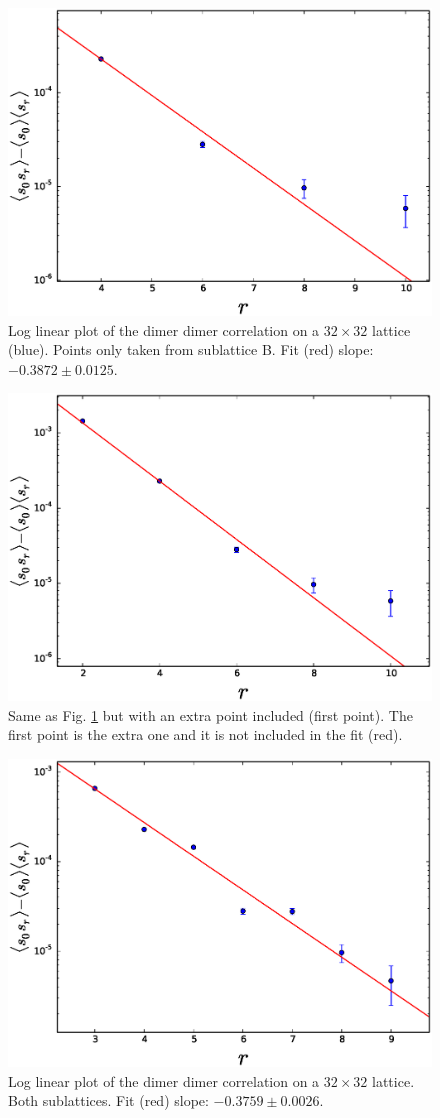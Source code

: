 \documentclass[aps,floatfix,11pt]{revtex4-1}
\begin{document}
\begin{figure}[h]
    \centering
    \includegraphics[width=8.5 cm]{s_dimer_dimer_cor_loglin_one_sublat_B_32x32}
    \caption{Log linear plot of the dimer dimer correlation on a $32\times32$ lattice (blue). 
        Points only taken from sublattice B. Fit (red) slope: $-0.3872 \pm 0.0125$. 
    \label{fig:s_dimer_dimer_cor_loglin_one_sublat_B_32x32}}
\end{figure}

\begin{figure}[h]
    \centering
    \includegraphics[width=8.5 cm]{s_dimer_dimer_cor_loglin_one_sublat_B_32x32_extra_pnt}
    \caption{Same as Fig. \ref{fig:s_dimer_dimer_cor_loglin_one_sublat_B_32x32} but with an extra
        point included (first point). The first point is the extra one and 
        it is not included in the fit (red).
    \label{fig:s_dimer_dimer_cor_loglin_one_sublat_B_32x32_extra_pnt}}
\end{figure}

\begin{figure}[h]
    \centering
    \includegraphics[width=8.5 cm]{s_dimer_dimer_cor_loglin_both_sublat_32x32}
    \caption{Log linear plot of the dimer dimer correlation on a $32\times32$ lattice. 
        Both sublattices. Fit (red) slope: $ -0.3759 \pm 0.0026$.
    \label{fig:s_dimer_dimer_log}}
\end{figure}
\end{document}
